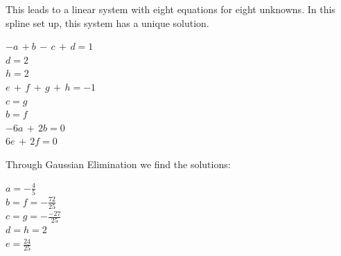 \documentclass[a4paper,12pt,]{report}
\begin{document}
	\noindent This leads to a linear system with eight equations for eight unknowns.  In this spline set up, this system has a unique solution.

\begin{center}


\fbox
{
	\parbox{0.4\textwidth}
	{
		\begin{center}
			$-a\,+b\,-\,c\,+\,d = 1$\\
			$d = 2$\\
			$h = 2$\\
			$e\,+\,f\,+\,g\,+\,h = -1$\\
			$c = g$\\
			$b = f$\\
			$-6a\,+\,2b=0$\\
			$6e\,+\,2f=0$
		\end{center}
	}
}

\end{center}


	\noindent Through Gaussian Elimination we find the solutions:
\begin{center}
\fbox
{
	\parbox{0.4\textwidth}
	{
	\begin{center}
		$a = -\frac{4}{5}$\\
		\medskip
		$b = f = - \frac{72}{25}$\\
		\medskip
		$c = g = -\frac{-27}{25}$\\
		\medskip
		$d = h = 2$\\
		\medskip
		$e = \frac{24}{25}$\\
	\end{center}
	}
}
\end{center}
\end{document}
